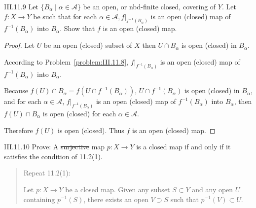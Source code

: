 \begin{problem}{III.11.9}
Let \(\{ B_{\alpha} \mid \alpha \in \mathscr{A} \}\) be an open, or nbd-finite closed, covering of \( Y \). Let \( f: X \to Y \) be such that for each \( \alpha \in \mathscr{A}, f\vert_{f^{-1}(B_{\alpha})} \) is an open (closed) map of \( f^{-1}(B_{\alpha}) \) into \( B_{\alpha} \). Show that \( f \) is an open (closed) map.
\end{problem}

\begin{proof}
    Let \( U \) be an open (closed) subset of \( X \) then \( U \cap B_{\alpha} \) is open (closed) in \( B_{\alpha} \).

    According to Problem~\ref{problem:III.11.8}, \( f\vert_{f^{-1}(B_{\alpha})} \) is an open (closed) map of \( f^{-1}(B_{\alpha}) \) into \( B_{\alpha} \).

    Because \( f(U) \cap B_{\alpha} = f(U \cap f^{-1}(B_{\alpha})) \), \( U \cap f^{-1}(B_{\alpha}) \) is open (closed) in \( B_{\alpha} \), and for each \( \alpha \in \mathscr{A} \), \( f\vert_{f^{-1}(B_{\alpha})} \) is an open (closed) map of \( f^{-1}(B_{\alpha}) \) into \( B_{\alpha} \), then \( f(U) \cap B_{\alpha} \) is open (closed) for each \( \alpha \in \mathscr{A} \).

    Therefore \( f(U) \) is open (closed). Thus \( f \) is an open (closed) map.
\end{proof}

\begin{problem}{III.11.10}\label{problem:III.11.10}
Prove: A \st{surjective} map \( p: X \to Y \) is a closed map if and only if it satisfies the condition of 11.2(1).
\end{problem}

\begin{quote}
    Repeat 11.2(1):

    Let \( p: X \to Y \) be a closed map. Given any subset \( S \subset Y \) and any open \( U \) containing \( p^{-1}(S) \), there exists an open \( V \supset S \) such that \( p^{-1}(V) \subset U \).
\end{quote}

